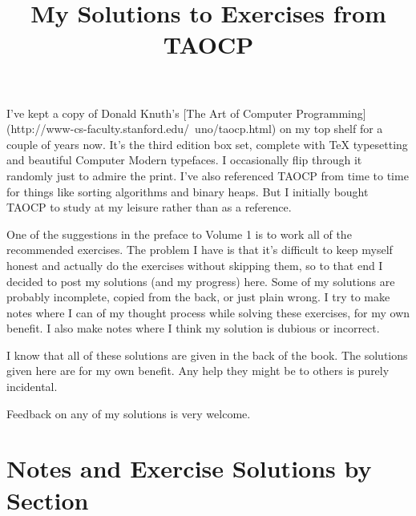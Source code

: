 \title{My Solutions to Exercises from TAOCP}


I've kept a copy of Donald Knuth's [The Art of Computer
Programming](http://www-cs-faculty.stanford.edu/~uno/taocp.html) on my
top shelf for a couple of years now. It's the third edition box set, complete with
TeX typesetting and beautiful Computer Modern typefaces. I occasionally flip
through it randomly just to admire the print. I've also referenced TAOCP from
time to time for things like sorting algorithms and binary heaps. But I
initially bought TAOCP to study at my leisure rather than as a reference.


One of the suggestions in the preface to Volume 1 is to work all of the
recommended exercises. The problem I have is that it's difficult to keep myself
honest and actually do the exercises without skipping them, so to that end I
decided to post my solutions (and my progress) here. Some of my solutions are
probably incomplete, copied from the back, or just plain wrong. I try to make
notes where I can of my thought process while solving these exercises, for my
own benefit. I also make notes where I think my solution is dubious or
incorrect.

I know that all of these solutions are given in the back of the book. The
solutions given here are for my own benefit. Any help they might be to
others is purely incidental.

Feedback on any of my solutions is very welcome.

\section*{Notes and Exercise Solutions by Section}
